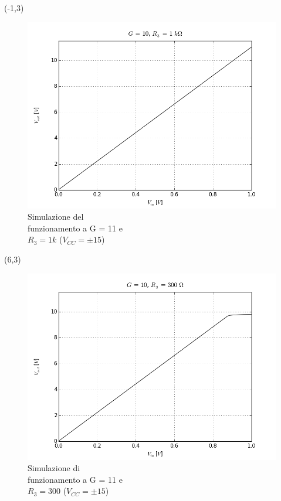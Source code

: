 \documentclass{beamer}
\begin{document}
\begin{frame}

\begin{textblock}{12}(-1,3)
\begin{figure}
\centering
\includegraphics[width=0.6\linewidth]{./g_10_r_1k_dc_v}
\caption{Simulazione del \\
funzionamento a G = 11 e \\
$R_3 = 1k$ ($V_{CC} = \pm 15$)}
\label{fig:bla}
\end{figure}
\end{textblock}


\begin{textblock}{12}(6,3)
\begin{figure}
\centering
\includegraphics[width=0.6\linewidth]{./g_10_r_300_dc_v}
\caption{Simulazione di \\ 
funzionamento a G = 11 e \\
$R_3 = 300$ ($V_{CC} = \pm 15$)}
\label{fig:prova_gen_10khz_50mpp}
\end{figure}
\end{textblock}



\end{frame}
\end{document}
